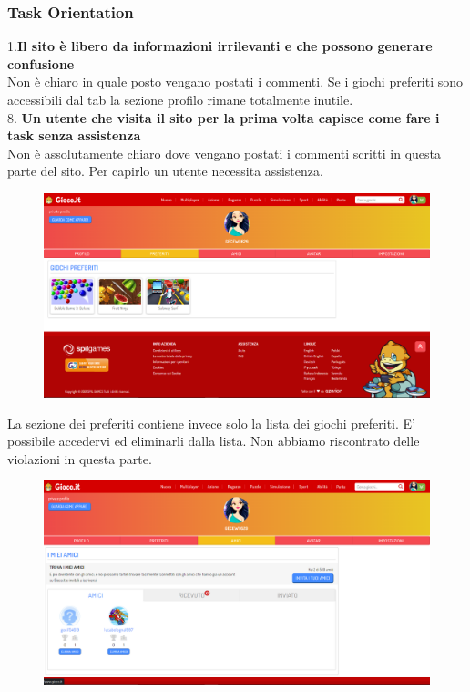 \documentclass[../Report.tex]{subfiles}
\begin{document}
    \subsubsection{Task Orientation}
    1.\textbf{Il sito è libero da informazioni irrilevanti e che possono generare confusione}\\
        Non è chiaro in quale posto vengano postati i commenti. Se i giochi preferiti sono accessibili dal tab la sezione profilo rimane totalmente inutile.\\
    
    8.\textbf{ Un utente che visita il sito per la prima volta capisce come fare i task senza assistenza}\\
    Non è assolutamente chiaro dove vengano postati i commenti scritti in questa parte del sito. Per capirlo un utente necessita assistenza.\\

    \begin{figure}[H]
        \includegraphics[width=\linewidth]{Assestment14.png}
        \centering
    \end{figure}

    La sezione dei preferiti contiene invece solo la lista dei giochi preferiti. E’ possibile accedervi ed eliminarli dalla lista. Non abbiamo riscontrato delle violazioni in questa parte.

    \begin{figure}[H]
        \includegraphics[width=\linewidth]{Assestment15.png}
        \centering
    \end{figure}
\end{document}
